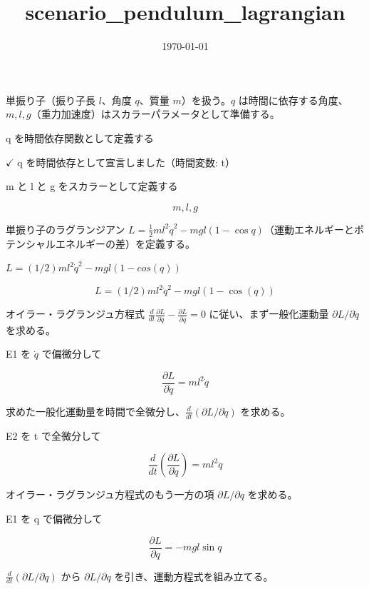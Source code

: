 \documentclass[dvipdfmx,a4paper,11pt]{jsarticle}
\title{scenario\_pendulum\_lagrangian}
\date{\today}
\begin{document}
\maketitle

単振り子（振り子長 $l$、角度 $q$、質量 $m$）を扱う。$q$ は時間に依存する角度、$m,l,g$（重力加速度）はスカラーパラメータとして準備する。

q を時間依存関数として定義する

$\checkmark$ q を時間依存として宣言しました（時間変数: t）

m と l と g をスカラーとして定義する

\[
  m, l, g
\]

単振り子のラグランジアン $L=\frac12ml^2\dot q^2-mgl(1-\cos q)$（運動エネルギーとポテンシャルエネルギーの差）を定義する。

$L = (1/2) m l^2 \dot{q}^2 - m g l (1 - cos(q))$

\begin{equation}
  L = (1/2) m l^2 \dot{q}^2 - m g l (1 - \cos(q))
  \label{eq:E1}
\end{equation}

オイラー・ラグランジュ方程式 $\frac{d}{dt}\frac{\partial L}{\partial\dot q}-\frac{\partial L}{\partial q}=0$ に従い、まず一般化運動量 $\partial L/\partial\dot q$ を求める。

E1 を $\dot{q}$ で偏微分して

\begin{equation}
  \frac{\partial L}{\partial \dot{q}} = m l^2 \dot{q}
  \label{eq:E2}
\end{equation}

求めた一般化運動量を時間で全微分し、$\frac{d}{dt}(\partial L/\partial\dot q)$ を求める。

E2 を t で全微分して

\begin{equation}
  \frac{d}{dt}\left(\frac{\partial L}{\partial \dot{q}}\right) = m l^2 \ddot{q}
  \label{eq:E3}
\end{equation}

オイラー・ラグランジュ方程式のもう一方の項 $\partial L/\partial q$ を求める。

E1 を q で偏微分して

\begin{equation}
  \frac{\partial L}{\partial q} = -m g l \sin q
  \label{eq:E4}
\end{equation}

$\frac{d}{dt}(\partial L/\partial\dot q)$ から $\partial L/\partial q$ を引き、運動方程式を組み立てる。
\end{document}
